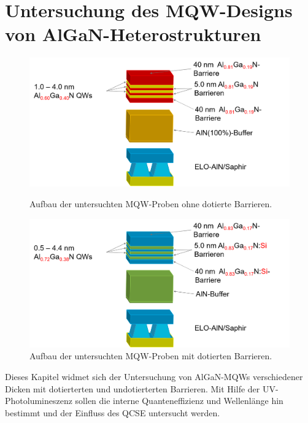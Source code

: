 \thispagestyle{fancy}
\justifying

\section{Untersuchung des MQW-Designs von AlGaN-Heterostrukturen}
\label{sec:mqw}
%
\begin{figure}[H]
  \centering
  \begin{minipage}[t]{0.49\textwidth}
    \centering
    \includegraphics[width=\textwidth]{Bilder/MQWdickenSerie/undotiert}
		\caption{Aufbau der untersuchten MQW-Proben ohne dotierte Barrieren.}
    \label{fig:undotiert}
  \end{minipage}
	\hfill
  \begin{minipage}[t]{0.49\textwidth}
    \centering
    \includegraphics[width=\linewidth]{Bilder/MQWdickenSerie/dotiert}
		\caption{Aufbau der untersuchten MQW-Proben mit dotierten Barrieren.}
    \label{fig:dotiert}
  \end{minipage}
\end{figure}
\noindent 
% 
Dieses Kapitel widmet sich der Untersuchung von AlGaN-MQWs verschiedener Dicken mit dotierterten und undotierterten Barrieren. Mit Hilfe der UV-Photolumineszenz sollen die interne Quanteneffizienz und Wellenlänge hin bestimmt und der Einfluss des QCSE untersucht werden. 
